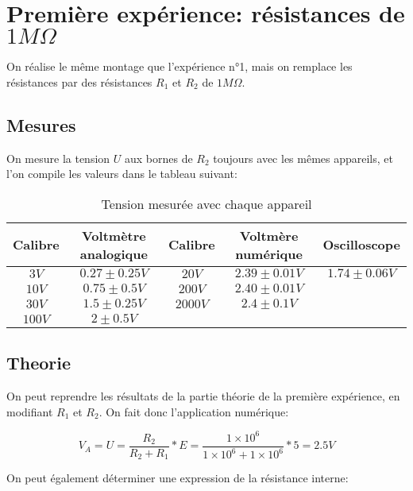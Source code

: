 \documentclass[10pt]{article}
\begin{document}
\section{Première expérience: résistances de $1M \Omega$}
On réalise le même montage que l'expérience n°1, mais on remplace les résistances par des résistances $R_1$ et $R_2$ de $1M\Omega$.

\subsection{Mesures}
On mesure la tension $U$ aux bornes de $R_2$ toujours avec les mêmes appareils, et l'on compile les valeurs dans le tableau suivant:

\begin{table}[h!]
    \begin{center}
        \begin{tabular}{|c|c||c|c||c|}
            \hline
            Calibre & Voltmètre analogique & Calibre & Voltmère numérique & Oscilloscope \\
            \hline
            $3V$ & $0.27 \pm 0.25V$ & $20V$ & $2.39 \pm 0.01V$ & $1.74 \pm 0.06V$ \\
            $10V$ & $0.75 \pm 0.5V$ & $200V$ & $2.40 \pm 0.01V$ &  \\
            $30V$ & $1.5 \pm 0.25V$ & $2000V$ & $2.4 \pm 0.1V$ &  \\
            $100V$ & $2 \pm 0.5V$ & & & \\
            \hline
        \end{tabular}
        \caption{Tension mesurée avec chaque appareil}
        \label{table:table2}
    \end{center}

    \subsection{Theorie}
    On peut reprendre les résultats de la partie théorie de la première expérience, en modifiant $R_1$ et $R_2$. On fait donc 
    l'application numérique:

    \begin{equation}
        V_A = U = \frac{R_2}{R_2 + R_1} * E = \frac{1 \times 10^6}{1 \times 10^6 + 1 \times 10^6} * 5 = 2.5V
    \end{equation}

    On peut également déterminer une expression de la résistance interne:
    

\end{table}
\end{document}
